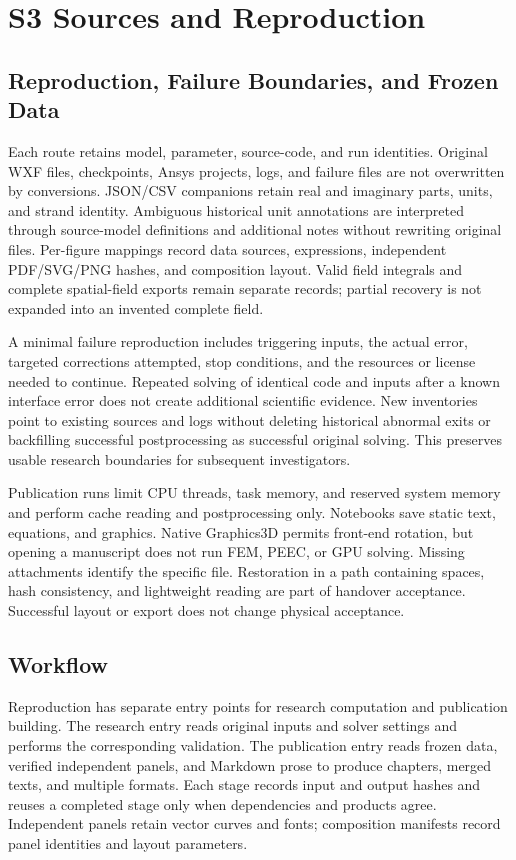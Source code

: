 \documentclass[journal,10pt]{IEEEtran}
\begin{document}
\section*{S3 Sources and Reproduction}
\hypertarget{chapter-S3}{}
\subsection*{Reproduction, Failure Boundaries, and Frozen Data}
\hypertarget{S3.report_repro.heading}{}
Each route retains model, parameter, source-code, and run identities. Original WXF files, checkpoints, Ansys projects, logs, and failure files are not overwritten by conversions. JSON/CSV companions retain real and imaginary parts, units, and strand identity. Ambiguous historical unit annotations are interpreted through source-model definitions and additional notes without rewriting original files. Per-figure mappings record data sources, expressions, independent PDF/SVG/PNG hashes, and composition layout. Valid field integrals and complete spatial-field exports remain separate records; partial recovery is not expanded into an invented complete field.


A minimal failure reproduction includes triggering inputs, the actual error, targeted corrections attempted, stop conditions, and the resources or license needed to continue. Repeated solving of identical code and inputs after a known interface error does not create additional scientific evidence. New inventories point to existing sources and logs without deleting historical abnormal exits or backfilling successful postprocessing as successful original solving. This preserves usable research boundaries for subsequent investigators.


Publication runs limit CPU threads, task memory, and reserved system memory and perform cache reading and postprocessing only. Notebooks save static text, equations, and graphics. Native Graphics3D permits front-end rotation, but opening a manuscript does not run FEM, PEEC, or GPU solving. Missing attachments identify the specific file. Restoration in a path containing spaces, hash consistency, and lightweight reading are part of handover acceptance. Successful layout or export does not change physical acceptance.


\subsection*{Workflow}
\hypertarget{S3.workflow.heading}{}
Reproduction has separate entry points for research computation and publication building. The research entry reads original inputs and solver settings and performs the corresponding validation. The publication entry reads frozen data, verified independent panels, and Markdown prose to produce chapters, merged texts, and multiple formats. Each stage records input and output hashes and reuses a completed stage only when dependencies and products agree. Independent panels retain vector curves and fonts; composition manifests record panel identities and layout parameters.
\end{document}
